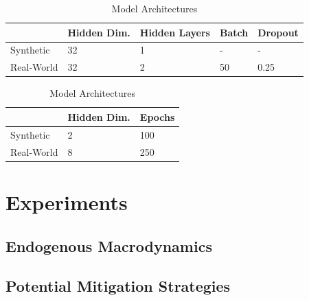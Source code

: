 \documentclass[
  conference]{IEEEtran}
\begin{document}
\begin{table}

\caption{\label{tbl-panel}Model
Architectures}\begin{minipage}[t]{\linewidth}

{\centering 

\begin{tabular}[t]{lllll}
\toprule
 & Hidden Dim. & Hidden Layers & Batch & Dropout\\
\midrule
Synthetic & 32 & 1 & - & -\\
Real-World & 32 & 2 & 50 & 0.25\\
\bottomrule
\end{tabular}

}

\end{minipage}%
\newline
\begin{minipage}[t]{\linewidth}

{\centering 

\begin{tabular}[t]{lll}
\toprule
 & Hidden Dim. & Epochs\\
\midrule
Synthetic & 2 & 100\\
Real-World & 8 & 250\\
\bottomrule
\end{tabular}

}

\end{minipage}%

\end{table}

\hypertarget{sec-empirical-2}{%
\section{Experiments}\label{sec-empirical-2}}

\hypertarget{endogenous-macrodynamics}{%
\subsection{Endogenous Macrodynamics}\label{endogenous-macrodynamics}}

\hypertarget{potential-mitigation-strategies}{%
\subsection{Potential Mitigation
Strategies}\label{potential-mitigation-strategies}}
\end{document}
